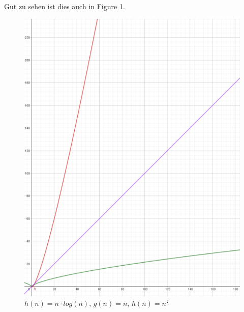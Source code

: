 \documentclass[a4paper,11pt]{scrartcl}
\begin{document}
Gut zu sehen ist dies auch in Figure 1.
\begin{figure}[h]
\begin{center}
\includegraphics[scale=.7]{a2c_plot}
\caption{{\color{red} $h(n)=n\cdot log(n)$}, {\color{purple} $g(n)=n$}, {\color{DarkGreen} $h(n)=n^{\frac{2}{3}}$} }
\end{center}
\end{figure}
\end{document}
